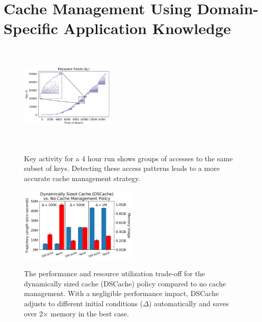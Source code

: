 \section{Cache Management Using Domain-Specific Application Knowledge}
\label{sec:dom-specific}
\begin{figure}[t]
  \noindent\includegraphics[height=5cm,width=0.4\textwidth]{figures/keyspace-zoomed.png}\\

  \caption{Key activity for a 4 hour run shows groups of accesses to the same
  subset of keys. Detecting these access patterns leads to a more accurate cache
  management strategy.\label{fig:keyspace-zoomed}}

\end{figure}

\begin{figure}[t]
\noindent\includegraphics[width=0.5\textwidth]{figures/dscache-vs-none.png}\\

\caption{The performance and resource utilization trade-off for the dynamically
sized cache (DSCache) policy compared to no cache management. With a negligible
performance impact, DSCache adjusts to different initial conditions
(\(\Delta\)) automatically and saves over 2\(\times\) memory in the best case.
\label{fig:dscache-vs-none}}
\end{figure}

